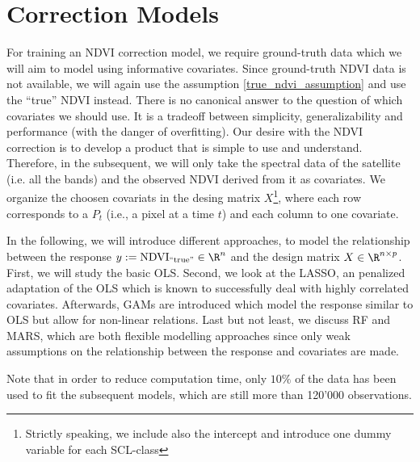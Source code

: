 \section{Correction Models}{
        \label{sec:corr_data_table}
        \label{sec:corr_methods}

    For training an NDVI correction model, we require ground-truth data which we will aim to model using informative covariates. Since ground-truth NDVI data is not available, we will again use the assumption \ref{true_ndvi_assumption} and use the ``true'' NDVI instead. There is no canonical answer to the question of which covariates we should use. It is a tradeoff between simplicity, generalizability and performance (with the danger of overfitting). 
    Our desire with the NDVI correction is to develop a product that is simple to use and understand. Therefore, in the subsequent, we will only take the spectral data of the satellite (i.e. all the bands) and the observed NDVI derived from it as covariates. We organize the choosen covariats in the desing matrix $X$\footnote{Strictly speaking, we include also the intercept and introduce one dummy variable for each SCL-class}, where each row corresponds to a $P_t$ (i.e., a pixel at a time $t$) and each column to one covariate.    

    In the following, we will introduce different approaches, to model the relationship between the response $y:=\operatorname{NDVI}_\text{``true''}\in \R^n$ and the design matrix $X\in\R^{n \times p}$. First, we will study the basic OLS. Second, we look at the LASSO, an penalized adaptation of the OLS which is known to successfully deal with highly correlated covariates. Afterwards, GAMs are introduced which model the response similar to OLS but allow for non-linear relations. Last but not least, we discuss RF and MARS, which are both flexible modelling approaches since only weak assumptions on the relationship between the response and covariates are made. 

    Note that in order to reduce computation time, only $10\%$ of the data has been used to fit the subsequent models, which are still more than 120'000 observations. 
    
    
}


